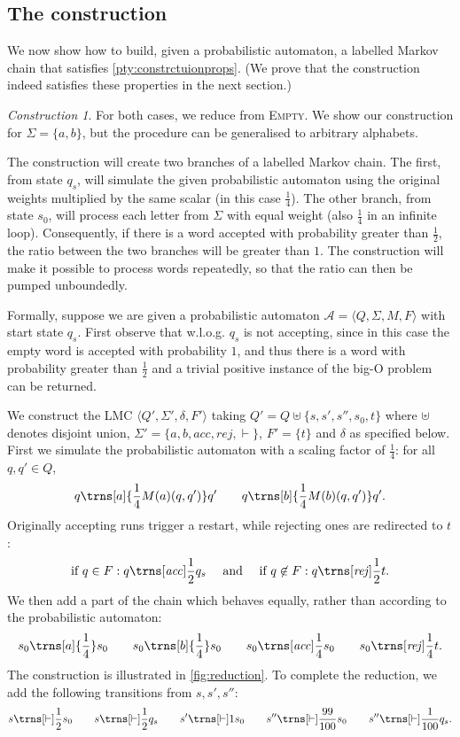 \documentclass{lmcs}
\theoremstyle{plain}
\theoremstyle{definition}
\theoremstyle{remark}
\newtheorem{construction}[thm]{Construction}
\newcommand\acc{\mathit{acc}}
\newcommand\rej{\mathit{rej}}
\newcommand\abra[1]{\langle #1 \rangle}
\newcommand\pa{\mathcal{A}}
\begin{document}
\subsection{The construction}
\label{sec:undeci:construction}
We now show how to build, given a probabilistic automaton, a labelled Markov chain that satisfies \cref{pty:constrctuionprops}. (We prove that the construction indeed satisfies these properties in the next section.)
\begin{construction}\label{construction:undec} For both cases, we reduce from \textsc{Empty}.
We show our construction for $\Sigma{} = \{a,b\}$, but the procedure can be generalised to arbitrary alphabets.

The construction will create two branches of a labelled Markov chain.
The first, from state $q_s$, will simulate the given probabilistic automaton using the original weights multiplied by the same scalar (in this case $\frac{1}{4}$).
The other branch, from state $s_0$, will process each letter from $\Sigma$ with equal weight (also $\frac{1}{4}$ in an infinite loop). Consequently,
 if there is a word accepted with probability greater than $\frac{1}{2}$, the ratio between the two branches will be greater than $1$.
 The construction will make it possible to process words repeatedly, so that the ratio can then be pumped unboundedly.

Formally, suppose we are given a probabilistic automaton $\pa = \abra{Q,\Sigma, M,F}$ with start state $q_s$. First observe that w.l.o.g. $q_s$ is not accepting, since in this case the empty word is accepted with probability $1$, and thus there is a word with probability greater than $\frac{1}{2}$ and a trivial positive instance of the big-O problem can be returned.

We construct the LMC
$\abra{Q',\Sigma', \delta, F'}$ taking $Q' =Q \uplus \{s, s', s'', s_0, t\}$ where $\uplus$ denotes disjoint union, $\Sigma' = \{a,b,\acc,\rej, {\vdash}\}$, $F' = \{t\}$ and $\delta$ as specified below.
First we simulate the probabilistic automaton with a scaling factor of $\frac{1}{4}$: for all $q,q'\in Q$,
\[
  q\trns[a]{\frac{1}{4}M(a)(q,q')} q' \quad  \quad  q\trns[b]{\frac{1}{4}M(b)(q,q')} q'.
\]
Originally accepting runs trigger a restart, while rejecting ones are  redirected to $t$:
\[
\text{if }q \in F: q\trns[\acc]{\frac{1}{2}} q_s \quad \text{ and }  \quad \text{if } q \not\in F: q\trns[\rej]{\frac{1}{2}} t.
\]
We then add a part of the chain which behaves equally, rather than according to the probabilistic automaton:
\[
 s_0\trns[a]{\frac{1}{4}} s_0 \quad\quad s_0\trns[b]{\frac{1}{4}} s_0 \quad\quad s_0\trns[\acc]{\frac{1}{4}} s_0  \quad\quad s_0\trns[\rej]{\frac{1}{4}} t.
\]
The construction is illustrated in \cref{fig:reduction}. To complete the reduction, we add the following transitions from $s,s',s''$:
  \[ s \trns[{\vdash}]{\frac{1}{2}} s_0 \quad\quad  s \trns[{\vdash}]{\frac{1}{2}} q_s
 \quad\quad   s' \trns[{\vdash}]{1} s_0
 \quad\quad   s'' \trns[{\vdash}]{\frac{99}{100}} s_0 \quad\quad s'' \trns[{\vdash}]{\frac{1}{100}} q_s.
\]


\end{construction}
\end{document}
